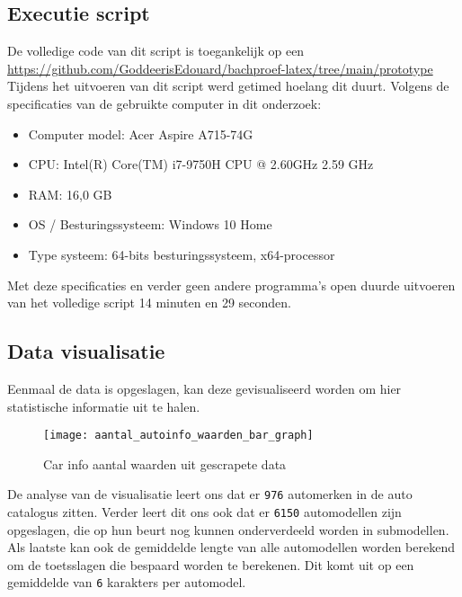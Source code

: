 \subsection{Executie script}
De volledige code van dit script is toegankelijk op een \href{github repo}{https://github.com/GoddeerisEdouard/bachproef-latex/tree/main/prototype}
Tijdens het uitvoeren van dit script werd getimed hoelang dit duurt.
Volgens de specificaties van de gebruikte computer in dit onderzoek:
\begin{itemize}
	\item Computer model: Acer Aspire A715-74G
	\item CPU: Intel(R) Core(TM) i7-9750H CPU @ 2.60GHz   2.59 GHz
	\item RAM: 16,0 GB 
	\item OS / Besturingssysteem: Windows 10 Home
	\item Type systeem: 64-bits besturingssysteem, x64-processor
\end{itemize}
Met deze specificaties en verder geen andere programma's open duurde uitvoeren van het volledige script 14 minuten en 29 seconden.

\subsection{Data visualisatie}
Eenmaal de data is opgeslagen, kan deze gevisualiseerd worden om hier statistische informatie uit te halen. 
\begin{figure}[H]
	\centering
	\texttt{[image: aantal\_autoinfo\_waarden\_bar\_graph]}
	\caption{Car info aantal waarden uit gescrapete data}
\end{figure}
De analyse van de visualisatie leert ons dat er \texttt{976} automerken in de auto catalogus zitten. Verder leert dit ons ook dat er \texttt{6150} automodellen zijn opgeslagen, die op hun beurt nog kunnen onderverdeeld worden in submodellen. Als laatste kan ook de gemiddelde lengte van alle automodellen worden berekend om de toetsslagen die bespaard worden te berekenen. Dit komt uit op een gemiddelde van \texttt{6} karakters per automodel.



